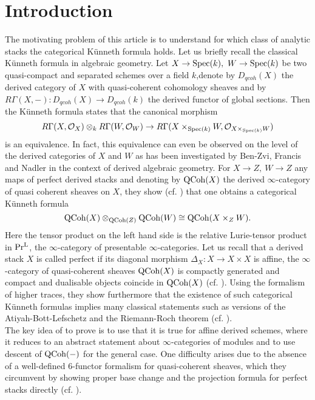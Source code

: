 \section{Introduction}

The motivating problem of this article is to understand for which class of analytic stacks the categorical Künneth formula holds. Let us briefly recall the classical Künneth formula in algebraic geometry. Let $X\to \operatorname{Spec}(k),\ W \to \operatorname{Spec}(k)$ be two quasi-compact and separated schemes over a field $k$,denote by $D_{qcoh}(X)$ the derived category of $X$ with quasi-coherent cohomology sheaves and by $R\Gamma(X,-): D_{qcoh}(X) \to D_{qcoh}(k)$ the derived functor of global sections. Then the Künneth formula states that the canonical morphism 
\[
R\Gamma(X,\mathcal{O}_X)\otimes_k R\Gamma(W,\mathcal{O}_W)\to R\Gamma(X\times_{\operatorname{Spec}(k)} W,\mathcal{O}_{X\times_{\operatorname{Spec}(k)}W} )
\]
is an equivalence. In fact, this equivalence can even be observed on the level of the derived categories of $X$ and $W$ as has been investigated by Ben-Zvi, Francis and Nadler in the context of derived algebraic geometry. For $X\to Z, \ W \to Z$ any maps of perfect derived stacks and denoting by $\operatorname{QCoh}(X)$ the derived $\infty$-category of quasi coherent sheaves on $X$, they show (cf. \Cite[Theorem 4.14]{ben2010integral}) that one obtains a categorical Künneth formula
\begin{equation}\label{künnethforperfect}
    \operatorname{QCoh}(X)\otimes_{\operatorname{QCoh}(Z)}\operatorname{QCoh}(W) \cong \operatorname{QCoh}(X\times_Z W).
\end{equation}
Here the tensor product on the left hand side is the relative Lurie-tensor product in $\operatorname{Pr^{L}}$, the $\infty$-category of presentable $\infty$-categories. Let us recall that a derived stack $X$ is called perfect if its diagonal morphism $\Delta_X : X \to X\times X$ is affine, the $\infty$-category of quasi-coherent sheaves $\operatorname{QCoh}(X)$ is compactly generated and compact and dualisable objects coincide in $\operatorname{QCoh}(X)$ (cf. \Cite[Proposition 3.9]{ben2010integral}). Using the formalism of higher traces, they show furthermore that the existence of such categorical Künneth formulas implies many classical statements such as versions of the Atiyah-Bott-Lefschetz and the Riemann-Roch theorem (cf. \Cite[Theorem 1.4]{ben2013nonlinear}). \\
 The key idea of \Cite{ben2010integral} to prove  is to use that it is true for affine derived schemes, where it reduces to an abstract statement about $\infty$-categories of modules and to use descent of $\operatorname{QCoh}(-)$ for the general case. One difficulty arises due to the absence of a well-defined $6$-functor formalism for quasi-coherent sheaves, which they circumvent by showing proper base change and the projection formula for perfect stacks directly (cf. \Cite[Section 3.2]{ben2010integral}). \newline \\
